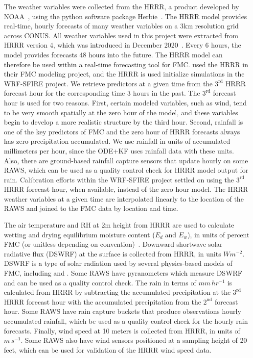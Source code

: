 \documentclass[fire,article,submit,pdftex,moreauthors]{Definitions/mdpi}
\begin{document}
The weather variables were collected from the HRRR, a product developed by NOAA~\citep{Dowell-2022-THR}, using the python software package Herbie~\citep{Blaylock-2024-HRM}. The HRRR model provides real-time, hourly forecasts of many weather variables on a 3km resolution grid across CONUS. All weather variables used in this project were extracted from HRRR version 4, which was introduced in December 2020~\citep{Dowell-2022-THR}. Every 6 hours, the model provides forecasts 48 hours into the future. The HRRR model can therefore be used within a real-time forecasting tool for FMC. \citet{Schreck-2023-MLV} used the HRRR in their FMC modeling project, and the HRRR is used initialize simulations in the WRF-SFIRE project. We retrieve predictors at a given time from the $3^{\text{rd}}$ HRRR forecast hour for the corresponding time 3 hours in the past. The $3^{\text{rd}}$ forecast hour is used for two reasons. First, certain modeled variables, such as wind, tend to be very smooth spatially at the zero hour of the model, and these variables begin to develop a more realistic structure by the third hour. Second, rainfall is one of the key predictors of FMC and the zero hour of HRRR forecasts always has zero precipitation accumulated. We use rainfall in units of accumulated millimeters per hour, since the ODE+KF uses rainfall data with these units. Also, there are ground-based rainfall capture sensors that update hourly on some RAWS, which can be used as a quality control check for HRRR model output for rain. Calibration efforts within the WRF-SFIRE project settled on using the $3^{\text{rd}}$ HRRR forecast hour, when available, instead of the zero hour model. The HRRR weather variables at a given time are interpolated linearly to the location of the RAWS and joined to the FMC data by location and time. 

The air temperature and RH at 2m height from HRRR are used to calculate wetting and drying equilibrium moisture content ($E_d$ and $E_w$), in units of percent FMC (or unitless depending on convention)~\citep[Eqs.\ 4 and 5,][]{VanWagner-1985-EFP}. Downward shortwave solar radiative flux (DSWRF) at the surface is collected from HRRR, in units $W m^{-2}$. DSWRF is a type of solar radiation used by several physics-based models of FMC, including \citet{Nelson-2000-PDC} and \citet{vanderKamp-2017-MFS}. Some RAWS have pyranometers which measure DSWRF and can be used as a quality control check. The rain in terms of $mm\,hr^{-1}$ is calculated from HRRR by subtracting the accumulated precipitation at the $3^{\text{rd}}$ HRRR forecast hour with the accumulated precipitation from the $2^{\text{nd}}$ forecast hour. Some RAWS have rain capture buckets that produce observations hourly accumulated rainfall, which be used as a quality control check for the hourly rain forecasts. Finally, wind speed at 10 meters is collected from HRRR, in units of $m\,s^{-1}$. Some RAWS also have wind sensors positioned at a sampling height of 20 feet, which can be used for validation of the HRRR wind speed data.
\end{document}
